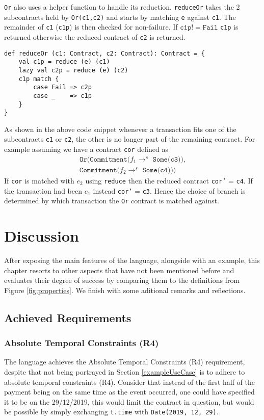 \documentclass{ituthesis}
\begin{document}
\texttt{Or} also uses a helper function to handle its reduction. \texttt{reduceOr} takes the 2 subcontracts held by \texttt{Or(c1,c2)} and starts by matching \texttt{e} against \texttt{c1}. The remainder of \texttt{c1} (\texttt{c1p}) is then checked for non-failure. If $\texttt{c1p} != \texttt{Fail}$ \texttt{c1p} is returned otherwise the reduced contract of \texttt{c2} is returned.
\begin{lstlisting}
def reduceOr (c1: Contract, c2: Contract): Contract = {
    val c1p = reduce (e) (c1)
    lazy val c2p = reduce (e) (c2)
    c1p match {
        case Fail => c2p
        case _    => c1p
    }
}
\end{lstlisting}
As shown in the above code snippet whenever a transaction fits one of the subcontracts \texttt{c1} or \texttt{c2}, the other is no longer part of the remaining contract. For example assuming we have a contract \texttt{cor} defined as
\begin{align*}
    \texttt{Or(Commitment($f_1 \rightarrow^s$ Some(c3)),} \\
    \texttt{Commitment($f_2 \rightarrow^s$ Some(c4)))}
\end{align*}
If \texttt{cor} is matched with $e_2$ using \texttt{reduce} then the reduced contract \texttt{cor'} = \texttt{c4}. If the transaction had been $e_1$ instead \texttt{cor'} = \texttt{c3}. Hence the choice of branch is determined by which transaction the \texttt{Or} contract is matched against.

\chapter{Discussion}

After exposing the main features of the language, alongside with an example, this chapter resorts to other aspects that have not been mentioned before and evaluates their degree of success by comparing them to the definitions from Figure \ref{fig:properties}. We finish with some aditional remarks and reflections.

\section{Achieved Requirements} \label{canDo}

\subsection{Absolute Temporal Constraints (R4)}
The language achieves the Absolute Temporal Constraints (R4) requirement, despite that not being portrayed in Section \ref{exampleUseCase} is to adhere to absolute temporal constraints (R4). Consider that instead of the first half of the payment being on the same time as the event occurred, one could have specified it to be on the 29/12/2019, this would limit the contract in question, but would be possible by simply exchanging \texttt{t.time} with \texttt{Date(2019, 12, 29)}.
\end{document}
